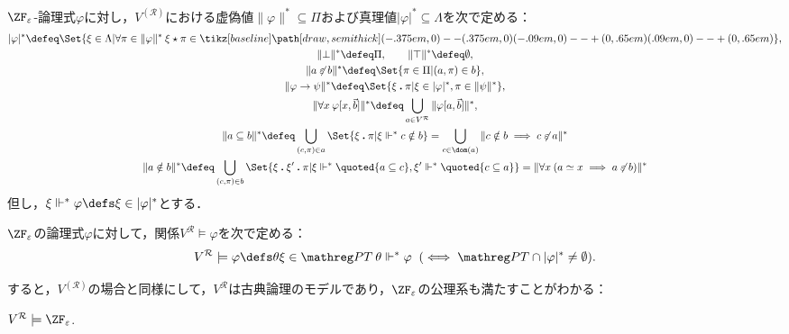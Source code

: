 \documentclass[realisability.tex]{subfiles}
\begin{document}
\begin{definition}
 $\ZFe$-論理式$\varphi$に対し，$V^{(\mathcal{R})}$における虚偽値$\|\varphi\|^* \subseteq \Pi$および真理値$|\varphi|^* \subseteq \Lambda$を次で定める：
\begin{gather*}
  |\varphi|^* \defeq \Set{ \xi \in \Lambda | \forall \pi \in \|\varphi\|^* \: \xi \cons \pi \in \pole},\\
  \|\bot\|^* \defeq \Pi,\qquad \|\top\|^* \defeq \emptyset, \\
  \|a \strnin b\|^* \defeq \Set{ \pi \in \Pi | (a, \pi) \in b},\\
  \|\varphi \to \psi\|^* \defeq \Set{ \xi \push \pi | {\xi \in |\varphi|^*, \pi \in \|\psi\|^*}},\\
  \|\forall x \: \varphi[x, \vec{b}]\|^* \defeq \bigcup_{a \in V^{\mathcal{R}}} \| \varphi[a, \vec{b}]\|^*,\\
  \| a \subseteq b \|^* \defeq \bigcup_{(c, \pi) \in a} \Set{ \xi \push \pi | \xi \Vdash^* c \notin b}
  = \bigcup_{c \in \dom(a)} \|c \notin b \implies c \strnin a\|^*\\
  \| a \notin b \|^* \defeq \bigcup_{(c, \pi) \in b} \Set{ \xi \push \xi' \push \pi | \xi \Vdash^* \quoted{a \subseteq c}, \xi' \Vdash^* \quoted{c \subseteq a}}
   = \|\forall x \: (a \simeq x \implies a \strnin b)\|^*
 \end{gather*}
 但し，$\xi \Vdash^* \varphi \defs \xi \in |\varphi|^*$とする．

 $\ZF_{\varepsilon}$の論理式$\varphi$に対して，関係$V^{\mathcal{R}} \models \varphi$を次で定める：
 \[
  V^{\mathcal{R}} \models \varphi \defs \theta \xi \in \PT\: \theta \Vdash^* \varphi \mathrel{}(\iff \PT \cap |\varphi|^* \neq \emptyset).
 \]
\end{definition}
すると，$V^{(\mathcal{R})}$の場合と同様にして，$V^{\mathcal{R}}$は古典論理のモデルであり，$\ZFe$の公理系も満たすことがわかる：
\begin{theorem}\label{thm:name-model-ZFe}
 $V^{\mathcal{R}} \models \ZFe$.
\end{theorem}
\end{document}
